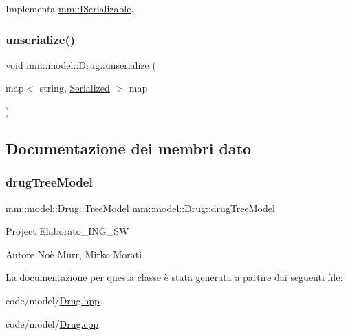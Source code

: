 Implementa \hyperlink{classmm_1_1_i_serializable_a20a59e2324c8dbf6fefe4d11ae89d0fb}{mm\+::\+I\+Serializable}.

\mbox{\label{classmm_1_1model_1_1_drug_adc9cd19eb2d0c3c271c01c41cf10d600}} 
\subsubsection{\texorpdfstring{unserialize()}{unserialize()}}
{\footnotesize\ttfamily void mm\+::model\+::\+Drug\+::unserialize (\begin{DoxyParamCaption}\item[{map$<$ string, \hyperlink{structmm_1_1_serialized}{Serialized} $>$}]{map }\end{DoxyParamCaption})\hspace{0.3cm}{\ttfamily [override]}}



\subsection{Documentazione dei membri dato}
\mbox{\label{classmm_1_1model_1_1_drug_a9169612d0fc3b3b25063a1686be30af9}} 
\subsubsection{\texorpdfstring{drug\+Tree\+Model}{drugTreeModel}}
{\footnotesize\ttfamily \hyperlink{structmm_1_1model_1_1_drug_1_1_tree_model}{mm\+::model\+::\+Drug\+::\+Tree\+Model} mm\+::model\+::\+Drug\+::drug\+Tree\+Model\hspace{0.3cm}{\ttfamily [static]}}

Project Elaborato\+\_\+\+I\+N\+G\+\_\+\+SW \begin{DoxyAuthor}{Autore}
Noè Murr, Mirko Morati 
\end{DoxyAuthor}


La documentazione per questa classe è stata generata a partire dai seguenti file\+:\begin{DoxyCompactItemize}
\item 
code/model/\hyperlink{_drug_8hpp}{Drug.\+hpp}\item 
code/model/\hyperlink{_drug_8cpp}{Drug.\+cpp}\end{DoxyCompactItemize}
